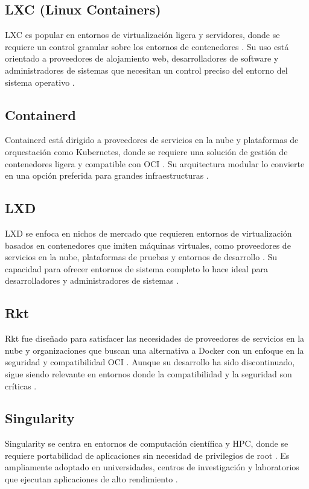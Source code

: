 \subsection*{LXC (Linux Containers)}
LXC es popular en entornos de virtualización ligera y servidores, donde se requiere un control granular sobre los entornos de contenedores \citep{Silva2024}. Su uso está orientado a proveedores de alojamiento web, desarrolladores de software y administradores de sistemas que necesitan un control preciso del entorno del sistema operativo \citep{Simon2023}.

\subsection*{Containerd}
Containerd está dirigido a proveedores de servicios en la nube y plataformas de orquestación como Kubernetes, donde se requiere una solución de gestión de contenedores ligera y compatible con OCI \citep{Vano2023}. Su arquitectura modular lo convierte en una opción preferida para grandes infraestructuras \citep{Zhou2021}.

\subsection*{LXD}
LXD se enfoca en nichos de mercado que requieren entornos de virtualización basados en contenedores que imiten máquinas virtuales, como proveedores de servicios en la nube, plataformas de pruebas y entornos de desarrollo \citep{Silva2024}. Su capacidad para ofrecer entornos de sistema completo lo hace ideal para desarrolladores y administradores de sistemas \citep{Kaiser2022}.

\subsection*{Rkt}
Rkt fue diseñado para satisfacer las necesidades de proveedores de servicios en la nube y organizaciones que buscan una alternativa a Docker con un enfoque en la seguridad y compatibilidad OCI \citep{Lingayat2018}. Aunque su desarrollo ha sido discontinuado, sigue siendo relevante en entornos donde la compatibilidad y la seguridad son críticas \citep{Watada2019}.

\subsection*{Singularity}
Singularity se centra en entornos de computación científica y HPC, donde se requiere portabilidad de aplicaciones sin necesidad de privilegios de root \citep{10.1145/3332186.3332192}. Es ampliamente adoptado en universidades, centros de investigación y laboratorios que ejecutan aplicaciones de alto rendimiento \citep{Kurtzer2017}.

